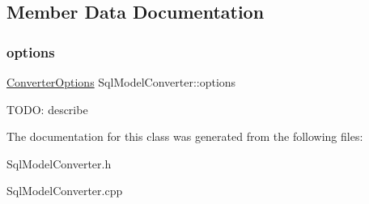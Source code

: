 \subsection{Member Data Documentation}
\mbox{\label{class_sql_model_converter_a562f55118cd1924c249796b6e183acbd}} 
\subsubsection{\texorpdfstring{options}{options}}
{\footnotesize\ttfamily \mbox{\hyperlink{class_converter_options}{Converter\+Options}} Sql\+Model\+Converter\+::options}

T\+O\+DO\+: describe 

The documentation for this class was generated from the following files\+:\begin{DoxyCompactItemize}
\item 
Sql\+Model\+Converter.\+h\item 
Sql\+Model\+Converter.\+cpp\end{DoxyCompactItemize}
